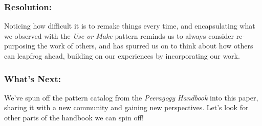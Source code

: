 \subsubsection*{Resolution:} Noticing how difficult it is to remake things every time, and encapsulating what we observed with the \emph{Use or Make} pattern reminds us to always consider re-purposing the work of others, and has spurred us on to think about how others can leapfrog ahead, building on our experiences by incorporating our work.

\subsubsection*{What's Next:} We've spun off the pattern catalog from the \emph{Peeragogy Handbook} into this paper, sharing it with a new community and gaining new perspectives.  Let's look for other parts of the handbook we can spin off!
